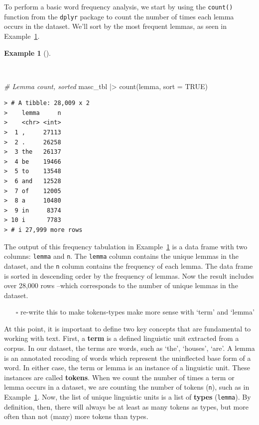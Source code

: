 \documentclass[
  letterpaper,
  DIV=11,
  numbers=noendperiod]{scrreport}
\newenvironment{Shaded}{\begin{snugshade}}{\end{snugshade}}
\newcommand{\AttributeTok}[1]{\textcolor[rgb]{0.00,0.00,0.00}{#1}}
\newcommand{\CommentTok}[1]{\textcolor[rgb]{0.00,0.00,0.00}{\textit{#1}}}
\newcommand{\ConstantTok}[1]{\textcolor[rgb]{0.00,0.00,0.00}{#1}}
\newcommand{\FunctionTok}[1]{\textcolor[rgb]{0.00,0.00,0.00}{#1}}
\newcommand{\NormalTok}[1]{\textcolor[rgb]{0.00,0.00,0.00}{#1}}
\newcommand{\SpecialCharTok}[1]{\textcolor[rgb]{0.00,0.00,0.00}{#1}}
\providecommand{\tightlist}{%
  \setlength{\itemsep}{0pt}\setlength{\parskip}{0pt}}\usepackage{longtable,booktabs,array}
\theoremstyle{definition}
\newtheorem{example}{Example}[chapter]
\theoremstyle{remark}
\begin{document}
To perform a basic word frequency analysis, we start by using the
\texttt{count()} function from the \texttt{dplyr} package to count the
number of times each lemma occurs in the dataset. We'll sort by the most
frequent lemmas, as seen in Example~\ref{exm-eda-masc-count}.

\begin{example}[]\protect\hypertarget{exm-eda-masc-count}{}\label{exm-eda-masc-count}

~

\begin{Shaded}
\begin{Highlighting}[]
\CommentTok{\# Lemma count, sorted}
\NormalTok{masc\_tbl }\SpecialCharTok{|\textgreater{}} 
  \FunctionTok{count}\NormalTok{(lemma, }\AttributeTok{sort =} \ConstantTok{TRUE}\NormalTok{)}
\end{Highlighting}
\end{Shaded}

\begin{verbatim}
> # A tibble: 28,009 x 2
>    lemma     n
>    <chr> <int>
>  1 ,     27113
>  2 .     26258
>  3 the   26137
>  4 be    19466
>  5 to    13548
>  6 and   12528
>  7 of    12005
>  8 a     10480
>  9 in     8374
> 10 i      7783
> # i 27,999 more rows
\end{verbatim}

\end{example}

The output of this frequency tabulation in
Example~\ref{exm-eda-masc-count} is a data frame with two columns:
\texttt{lemma} and \texttt{n}. The \texttt{lemma} column contains the
unique lemmas in the dataset, and the \texttt{n} column contains the
frequency of each lemma. The data frame is sorted in descending order by
the frequency of lemmas. Now the result includes over 28,000 rows
--which corresponds to the number of unique lemmas in the dataset.

\begin{itemize}
\tightlist
\item[$\square$]
  re-write this to make tokens-types make more sense with `term' and
  `lemma'
\end{itemize}

At this point, it is important to define two key concepts that are
fundamental to working with text. First, a \textbf{term} is a defined
linguistic unit extracted from a corpus. In our dataset, the terms are
words, such as `the', `houses', `are'. A lemma is an annotated recoding
of words which represent the uninflected base form of a word. In either
case, the term or lemma is an instance of a linguistic unit. These
instances are called \textbf{tokens}. When we count the number of times
a term or lemma occurs in a dataset, we are counting the number of
tokens (\texttt{n}), such as in Example~\ref{exm-eda-masc-count}. Now,
the list of unique linguistic units is a list of \textbf{types}
(\texttt{lemma}). By definition, then, there will always be at least as
many tokens as types, but more often than not (many) more tokens than
types.
\end{document}
